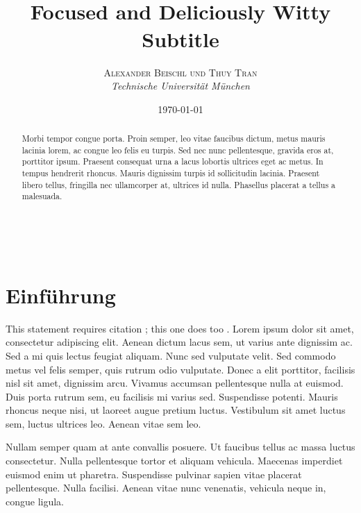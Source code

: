 \documentclass[a4paper, 12pt]{report} %
\title{\textbf{}\\ %
Focused and Deliciously Witty Subtitle} %
\author{\textsc{Alexander Beischl und Thuy Tran} %
\\{\textit{Technische Universität München}}} %
\date{\today} %
\makeatletter
\renewcommand{\maketitle}{ %
\begin{flushright} %
{\LARGE\@title} %

\vspace{50pt} %

{\large\@author} %
\\\@date %

\vspace{40pt} %
\end{flushright}
}
\makeatother
\begin{document}
\maketitle %


\renewcommand{\abstractname}{Zusammenfassung} %

\begin{abstract}
Morbi tempor congue porta. Proin semper, leo vitae faucibus dictum, metus mauris lacinia lorem, ac congue leo felis eu turpis. Sed nec nunc pellentesque, gravida eros at, porttitor ipsum. Praesent consequat urna a lacus lobortis ultrices eget ac metus. In tempus hendrerit rhoncus. Mauris dignissim turpis id sollicitudin lacinia. Praesent libero tellus, fringilla nec ullamcorper at, ultrices id nulla. Phasellus placerat a tellus a malesuada.
\end{abstract}


\vspace{30pt} %


\chapter{Einführung}\label{einführung}

This statement requires citation \cite{latexcompanion}; this one does too \cite{einstein}. Lorem ipsum dolor sit amet, consectetur adipiscing elit. Aenean dictum lacus sem, ut varius ante dignissim ac. Sed a mi quis lectus feugiat aliquam. Nunc sed vulputate velit. Sed commodo metus vel felis semper, quis rutrum odio vulputate. Donec a elit porttitor, facilisis nisl sit amet, dignissim arcu. Vivamus accumsan pellentesque nulla at euismod. Duis porta rutrum sem, eu facilisis mi varius sed. Suspendisse potenti. Mauris rhoncus neque nisi, ut laoreet augue pretium luctus. Vestibulum sit amet luctus sem, luctus ultrices leo. Aenean vitae sem leo.

Nullam semper quam at ante convallis posuere. Ut faucibus tellus ac massa luctus consectetur. Nulla pellentesque tortor et aliquam vehicula. Maecenas imperdiet euismod enim ut pharetra. Suspendisse pulvinar sapien vitae placerat pellentesque. Nulla facilisi. Aenean vitae nunc venenatis, vehicula neque in, congue ligula.
\end{document}
